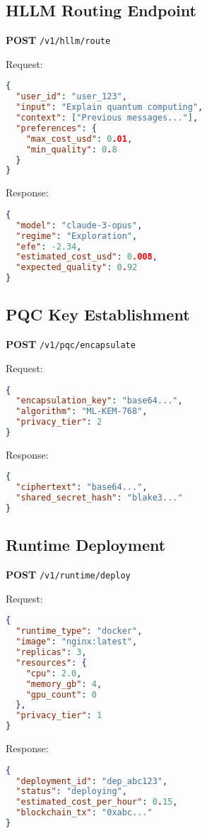 \documentclass[11pt,twocolumn]{article}
\begin{document}
\subsection{HLLM Routing Endpoint}

\textbf{POST} \texttt{/v1/hllm/route}

Request:
\begin{lstlisting}[language=json]
{
  "user_id": "user_123",
  "input": "Explain quantum computing",
  "context": ["Previous messages..."],
  "preferences": {
    "max_cost_usd": 0.01,
    "min_quality": 0.8
  }
}
\end{lstlisting}

Response:
\begin{lstlisting}[language=json]
{
  "model": "claude-3-opus",
  "regime": "Exploration",
  "efe": -2.34,
  "estimated_cost_usd": 0.008,
  "expected_quality": 0.92
}
\end{lstlisting}

\subsection{PQC Key Establishment}

\textbf{POST} \texttt{/v1/pqc/encapsulate}

Request:
\begin{lstlisting}[language=json]
{
  "encapsulation_key": "base64...",
  "algorithm": "ML-KEM-768",
  "privacy_tier": 2
}
\end{lstlisting}

Response:
\begin{lstlisting}[language=json]
{
  "ciphertext": "base64...",
  "shared_secret_hash": "blake3..."
}
\end{lstlisting}

\subsection{Runtime Deployment}

\textbf{POST} \texttt{/v1/runtime/deploy}

Request:
\begin{lstlisting}[language=json]
{
  "runtime_type": "docker",
  "image": "nginx:latest",
  "replicas": 3,
  "resources": {
    "cpu": 2.0,
    "memory_gb": 4,
    "gpu_count": 0
  },
  "privacy_tier": 1
}
\end{lstlisting}

Response:
\begin{lstlisting}[language=json]
{
  "deployment_id": "dep_abc123",
  "status": "deploying",
  "estimated_cost_per_hour": 0.15,
  "blockchain_tx": "0xabc..."
}
\end{lstlisting}
\end{document}
